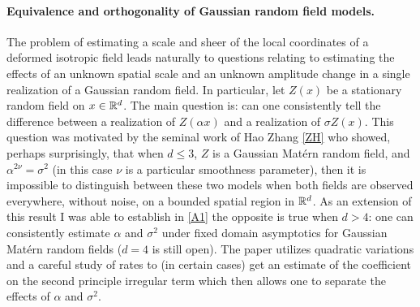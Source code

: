 \documentclass[12pt]{article}
\begin{document}
\paragraph{Equivalence and orthogonality of Gaussian random field models.}
The problem of estimating a scale and sheer of the local coordinates of a deformed isotropic  field leads naturally to questions relating to estimating the effects of an unknown spatial scale and an unknown amplitude change in a single realization of a Gaussian random field.
 In particular, let $Z(x)$ be a stationary random field on $x\in \Bbb R^d$. The main question is: can one consistently tell the difference between a realization of $Z(\alpha x)$ and a realization of $\sigma Z(x)$. This question was motivated by the seminal work of Hao Zhang \ref{ZH} who showed, perhaps surprisingly, that when  $d\leq 3$, $Z$ is a Gaussian Mat\'ern random field, and $\alpha^{2\nu} = \sigma^2$ (in this case $\nu$ is a particular smoothness parameter), then it is impossible to distinguish between these two models when both fields are observed everywhere, without noise, on a bounded spatial region in $\Bbb R^d$.
 As an extension of this result I was able to establish in \ref{A1} the opposite is true when  $d>4$:  one can consistently estimate $\alpha$ and $\sigma^2$ under fixed domain asymptotics  for  Gaussian Mat\'ern random fields ($d=4$ is still open).
The paper utilizes quadratic variations  and a careful study of rates to (in certain cases) get an estimate of the coefficient on the second principle irregular term which then allows one to separate the effects of $\alpha$ and $\sigma^2$.
\end{document}
